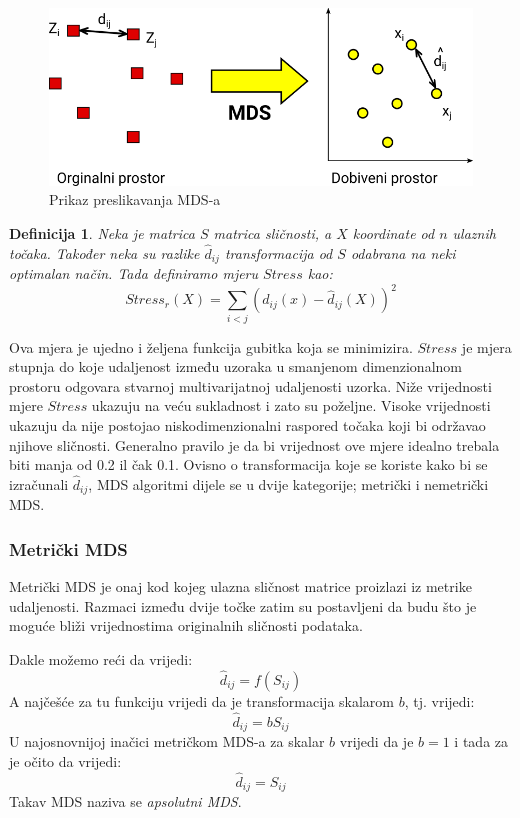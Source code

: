 \documentclass[times, utf8, diplomski]{fer}
\newtheorem{definition}{Definicija}         %
\begin{document}
\begin{figure}[htb]
    \centering
    \includegraphics[width=12cm]{resources/images/reduction/mds_mapping.png}
    \caption{Prikaz preslikavanja MDS-a}
    \label{fig:mds_mapping}
\end{figure}

\begin{definition}
    Neka je matrica $S$ matrica sličnosti, a $X$ koordinate od $n$ ulaznih točaka. Također neka su razlike $\hat{d}_{ij}$ transformacija od $S$ odabrana na neki optimalan način. Tada definiramo mjeru $Stress$ kao:
    \begin{equation}
        Stress_r(X) = \sum_{i < j} (d_{ij}(x) - \hat{d}_{ij}(X))^2
    \end{equation}
\end{definition}
Ova mjera je ujedno i željena funkcija gubitka koja se minimizira. $Stress$ je mjera stupnja do koje udaljenost između uzoraka u smanjenom dimenzionalnom prostoru odgovara stvarnoj multivarijatnoj udaljenosti uzorka. Niže vrijednosti mjere $Stress$ ukazuju na veću sukladnost i zato su poželjne. Visoke vrijednosti ukazuju da nije postojao niskodimenzionalni raspored točaka koji bi održavao njihove sličnosti. Generalno pravilo je da bi vrijednost ove mjere idealno trebala biti manja od 0.2 il čak 0.1.
Ovisno o transformacija koje se koriste kako bi se izračunali $\hat{d}_{ij}$, MDS algoritmi dijele se u dvije kategorije; metrički i nemetrički MDS.

\subsubsection{Metrički MDS}
Metrički MDS  je onaj kod kojeg ulazna sličnost matrice proizlazi iz metrike udaljenosti. Razmaci između dvije točke zatim su postavljeni da budu što je moguće bliži vrijednostima originalnih sličnosti podataka.

Dakle možemo reći da vrijedi:
\begin{equation}
    \hat{d}_{ij} = f(S_{ij})
\end{equation}
A najčešće za tu funkciju vrijedi da je transformacija skalarom $b$, tj. vrijedi:
\begin{equation}
    \hat{d}_{ij} = bS_{ij}
\end{equation}
U najosnovnijoj inačici metričkom MDS-a za skalar $b$ vrijedi da je $b = 1$ i tada za je očito da vrijedi:
\begin{equation}
    \hat{d}_{ij} = S_{ij}
\end{equation}
Takav MDS naziva se \emph{apsolutni MDS}.
\end{document}
